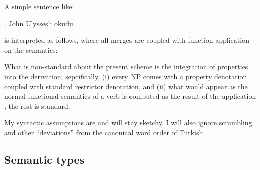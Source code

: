 \documentclass[11pt,a4paper]{article}
\begin{document}
A simple sentence like:

\ex. John Ulysses'i okudu.

is interpreted as follows, where all merges are coupled with function application on the semantics:



What is non-standard about the present scheme is the integration of properties into the derivation; sepcifically, (i) every NP comes with a property denotation coupled with standard restrictor denotation, and (ii) what would appear as the normal functional semantics of a verb is computed as the result of the application , the rest is standard.

My syntactic assumptions are and will stay sketchy. I will also ignore scrambling and other ``deviations'' from the canonical word order of Turkish.


\subsection{Semantic types}
\end{document}
